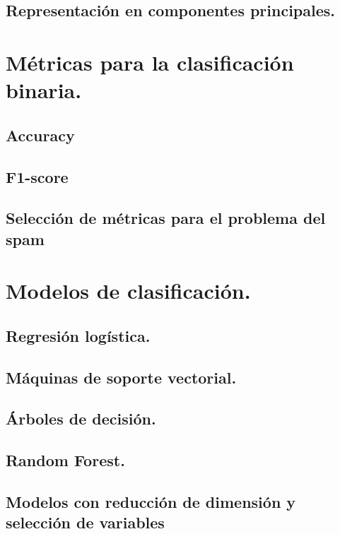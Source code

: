 \documentclass[12pt, letterpaper]{article}
\begin{document}
\subsection{Representación en componentes principales.}

\section{Métricas para la clasificación binaria.}

\subsection{Accuracy}

\subsection{F1-score}

\subsection{Selección de métricas para el problema del spam}

\section{Modelos de clasificación.}

\subsection{Regresión logística.}

\subsection{Máquinas de soporte vectorial.}

\subsection{Árboles de decisión.}

\subsection{Random Forest.}

\subsection{Modelos con reducción de dimensión y selección de variables}
\end{document}
